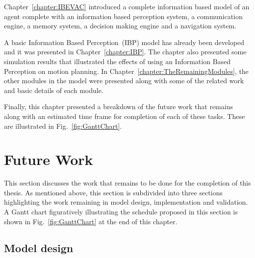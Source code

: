 Chapter~\ref{chapter:IBEVAC} introduced a complete information based model of an agent complete with an information based perception system, a communication engine, a memory system, a decision making engine and a navigation system.

A basic Information Based Perception~(IBP) model has already been developed and it was presented in Chapter~\ref{chapter:IBP}. The chapter also presented some simulation results that illustrated the effects of using an Information Based Perception on motion planning. In Chapter~\ref{chapter:TheRemainingModules}, the other modules in the model were presented along with some of the related work and basic details of each module.

Finally, this chapter presented a breakdown of the future work that remains along with an estimated time frame for completion of each of these tasks. These are illustrated in Fig.~\ref{fig:GanttChart}.


\section{Future Work}
\label{CFW:FutureWork}
This section discusses the work that remains to be done for the completion of this thesis. As mentioned above, this section is subdivided into three sections highlighting the work remaining in model design, implementation and validation. A Gantt chart figuratively illustrating the schedule proposed in this section is shown in Fig.~\ref{fig:GanttChart} at the end of this chapter.

\subsection{Model design}
\label{CFW:ModelDesign}

